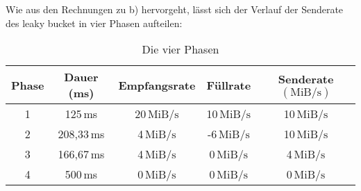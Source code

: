 \documentclass[a4paper,
			llpt,
			solution,
			accentcolor=tud2d,
			colorbacktitle
			]
			{tudexercise}
\newcommand{\MiBs}{\mathrm{MiB}/\mathrm{s}}
\begin{document}
\begin{enumerate}
Wie aus den Rechnungen zu b) hervorgeht, lässt sich der Verlauf der Senderate des leaky bucket in vier Phasen aufteilen:
\begin{table}[ht]
\caption{Die vier Phasen}
\centering
\begin{tabular}{|c|c|c|c|c|}
\hline
Phase 
&
Dauer (ms)
&
Empfangsrate
&
Füllrate
&
Senderate $\left( \MiBs \right)$
\\ \hline
1 & 125\,ms    & 20\,$\MiBs$ & 10\,$\MiBs$ & 10\,$\MiBs$ \\ \hline
2 & 208,33\,ms &  4\,$\MiBs$ & -6\,$\MiBs$ & 10\,$\MiBs$ \\ \hline
3 & 166,67\,ms &  4\,$\MiBs$ &  0\,$\MiBs$ &  4\,$\MiBs$ \\ \hline
4 & 500\,ms    &  0\,$\MiBs$ &  0\,$\MiBs$ &  0\,$\MiBs$ \\ \hline
\end{tabular}
\end{table}
\end{enumerate}
\end{document}
